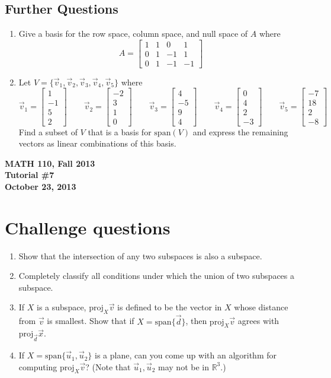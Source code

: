 \documentclass[11pt]{exam}
\newcommand{\R}{\mathbb{R}}
\newcommand{\proj}{\mathrm{proj}}
\newcommand{\mat}[1]{\begin{bmatrix}#1\end{bmatrix}}
\newcommand{\mthCourse}{MATH 110}
\newcommand{\mthTerm}{Fall 2013}
\newcommand{\mthTutorialNumber}{7}
\newcommand{\mthDate}{October 23, 2013}
\begin{document}
\subsection*{Further Questions}
\begin{enumerate}[resume]
	\item Give a basis for the row space, column space, and null space of $A$ where
		\[
			A=\mat{1&1&0&1\\0&1&-1&1\\0&1&-1&-1}
		\]
	\item Let $V=\{\vec v_1, \vec v_2, \vec v_3, \vec v_4, \vec v_5\}$
		where
		\[
			\vec v_1=\mat{1\\-1\\5\\2}\qquad
			\vec v_2=\mat{-2\\3\\1\\0}\qquad
			\vec v_3=\mat{4\\-5\\9\\4}\qquad
			\vec v_4=\mat{0\\4\\2\\-3}\qquad
			\vec v_5=\mat{-7\\18\\2\\-8}
		\]
		Find a subset of $V$ that is a
		basis for $\mathrm{span}( V)$ and express the remaining vectors as linear
		combinations of this basis.
\end{enumerate}




\newpage
{
	\begin{center}
		{\bf \mthCourse, \mthTerm}\\ 
		{\bf Tutorial \#\mthTutorialNumber}\\
		{\bf \mthDate}
	\end{center}
}

\section*{Challenge questions}

\begin{enumerate}[resume]
	\item Show that the intersection of any two subspaces is also a subspace.
	\item Completely classify all
		conditions under which the union of two subspaces a subspace.
	\item If $X$ is a subspace, $\proj_X\vec v$ is defined to be the vector
		in $X$ whose distance from $\vec v$ is smallest.
		Show that if $X=\mathrm{span}\{\vec d\}$, then $\proj_X \vec v$ agrees
		with $\proj_{\vec d}\vec x$.
	\item If $X=\mathrm{span}\{\vec u_1,\vec u_2\}$ is a plane, can you come up with an 
		algorithm for computing $\proj_X\vec v$?  (Note that $\vec u_1,
		\vec u_2$ may not be in $\R^3$.)

\end{enumerate}
\end{document}
